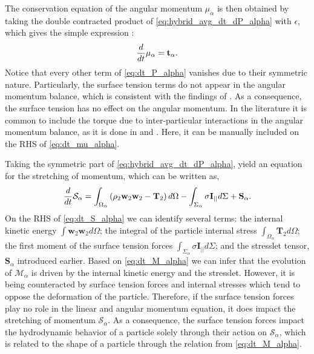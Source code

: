 The conservation equation of the angular momentum $\mu_\alpha$ is then obtained by taking the double contracted product of \ref{eq:hybrid_avg_dt_dP_alpha} with $\epsilon$, which gives the simple expression :
\begin{equation}
    \frac{d}{d t}\mu_\alpha
    =  
    \textbf{t}_\alpha.
    \label{eq:dt_mu_alpha}
\end{equation}
Notice that every other term of \ref{eq:dt_P_alpha} vanishes due to their symmetric nature. 
Particularly, the surface tension terms do not appear in the angular momentum balance, which is consistent with the findings of \citet{hesla1993note}. 
As a consequence, the surface tension has no effect on the angular momentum. 
In the literature it is common to include the torque due to inter-particular interactions in the angular momentum balance, as it is done in \citet{jackson1997locally} and \citet{zhang1997momentum}.
Here, it can be manually included on the RHS of \ref{eq:dt_mu_alpha}. 


Taking the symmetric part of \ref{eq:hybrid_avg_dt_dP_alpha}, yield an equation for the stretching of momentum, which can be written as,
\begin{equation}    
    \frac{d}{d t} \mathcal{S}_\alpha
    =  \int_{\Omega_\alpha} \left(
        \rho_2\textbf{w}_2 \textbf{w}_2
        - \mathbf{T}_2
        \right) d\Omega
        - \int_{\Sigma_\alpha} 
        \sigma \textbf{I}_{||}
        d\Sigma
        + \textbf{S}_\alpha.
    \label{eq:dt_S_alpha}
\end{equation}
On the RHS of \ref{eq:dt_S_alpha} we can identify several terms: 
the internal kinetic energy $\int \textbf{w}_2\textbf{w}_2 d\Omega$; 
the integral of the particle internal stress $\int_{\Omega_\alpha} \mathbf{T}_2 d\Omega$; 
the first moment of the surface tension forces $\int_{\Sigma_\alpha} \sigma \textbf{I}_{||} d\Sigma$; 
and the stresslet tensor, $\textbf{S}_\alpha$ introduced earlier.
Based on \ref{eq:dt_M_alpha} we can infer that the evolution of $\mathcal{M}_\alpha$ is driven by the internal kinetic energy and the stresslet.
However, it is being counteracted by surface tension forces and internal stresses which tend to oppose the deformation of the particle. 
Therefore, if the surface tension forces play no role in the linear and angular momentum equation, it does impact the stretching of momentum $\mathcal{S}_\alpha$.
As a consequence, the surface tension forces impact the hydrodynamic behavior of a particle solely through their action on $\mathcal{S}_\alpha$, which is related to the shape of a particle through the relation from \ref{eq:dt_M_alpha}.

